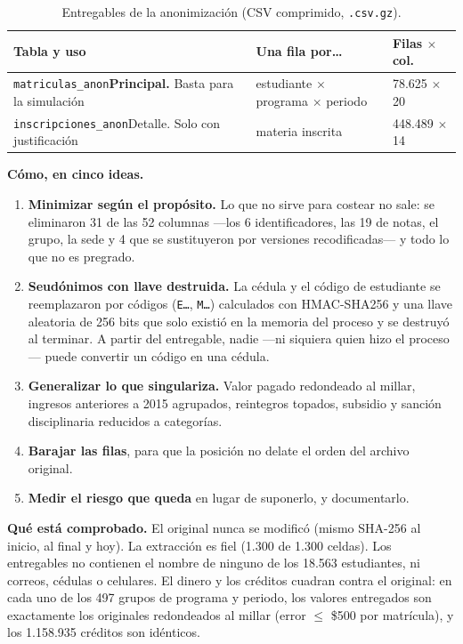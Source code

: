 \documentclass[11pt,a4paper,twoside,twocolumn]{article}
\newcommand{\cod}[1]{\nolinkurl{#1}}
\newcommand{\cab}[1]{\textcolor{ustaAzul}{\textbf{#1}}}
\begin{document}
\begin{table}[!ht]
\centering
\caption{Entregables de la anonimización (CSV comprimido, \texttt{.csv.gz}).}
\label{tab:entregables}
\footnotesize
\setlength{\tabcolsep}{3.5pt}
\begin{tabularx}{\columnwidth}{@{}P{3.3cm} L Q{1.45cm}@{}}
\toprule
\cab{Tabla y uso} & \cab{Una fila por\ldots} & \cab{Filas $\times$ col.} \\
\midrule
\cod{matriculas_anon}\newline \textbf{Principal.} Basta para la simulación & estudiante $\times$ programa $\times$ periodo & 78.625 $\times$ 20 \\
\cod{inscripciones_anon}\newline Detalle. Solo con justificación & materia inscrita & 448.489 $\times$ 14 \\
\bottomrule
\end{tabularx}
\end{table}

\textbf{Cómo, en cinco ideas.}

\begin{enumerate}[leftmargin=*,itemsep=2pt,topsep=0pt]
  \item \textbf{Minimizar según el propósito.} Lo que no sirve para costear no sale: se eliminaron
  31 de las 52 columnas ---los 6 identificadores, las 19 de notas, el grupo, la sede y 4 que se
  sustituyeron por versiones recodificadas--- y todo lo que no es pregrado.
  \item \textbf{Seudónimos con llave destruida.} La cédula y el código de estudiante se
  reemplazaron por códigos (\texttt{E…}, \texttt{M…}) calculados con HMAC-SHA256 y una llave aleatoria
  de 256 bits que solo existió en la memoria del proceso y se destruyó al terminar. A partir del
  entregable, nadie ---ni siquiera quien hizo el proceso--- puede convertir un código en una cédula.
  \item \textbf{Generalizar lo que singulariza.} Valor pagado redondeado al millar, ingresos
  anteriores a 2015 agrupados, reintegros topados, subsidio y sanción disciplinaria reducidos a
  categorías.
  \item \textbf{Barajar las filas}, para que la posición no delate el orden del archivo original.
  \item \textbf{Medir el riesgo que queda} en lugar de suponerlo, y documentarlo.
\end{enumerate}

\textbf{Qué está comprobado.} El original nunca se modificó (mismo SHA-256 al inicio, al final y
hoy). La extracción es fiel (1.300 de 1.300 celdas). Los entregables no contienen el nombre de
ninguno de los 18.563 estudiantes, ni correos, cédulas o celulares. El dinero y los créditos
cuadran contra el original: en cada uno de los 497 grupos de programa y periodo, los valores
entregados son exactamente los originales redondeados al millar (error $\leq$ \$500 por
matrícula), y los 1.158.935 créditos son idénticos.
\end{document}
